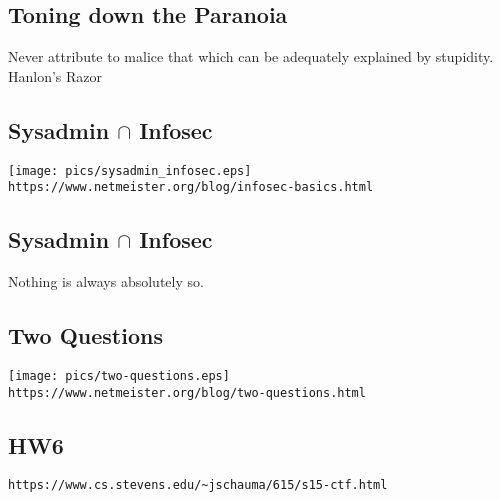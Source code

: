 \documentclass[xga]{xdvislides}
\begin{document}
\subsection{Toning down the Paranoia}
\vspace*{\fill}
\Huge
\begin{center}
Never attribute to malice that which can be adequately explained by stupidity. \\
\vspace{.25in}
\Normalsize
Hanlon's Razor
\end{center}
\Normalsize
\vspace*{\fill}

\subsection{Sysadmin $\cap$ Infosec}
\vspace*{\fill}
\begin{center}
	\texttt{[image: pics/sysadmin\_infosec.eps]} \\
	\verb+https://www.netmeister.org/blog/infosec-basics.html+
\end{center}
\vspace*{\fill}

\subsection{Sysadmin $\cap$ Infosec}
\vspace*{\fill}
\Huge
\begin{center}
	Nothing is always absolutely so.
\end{center}
\Normalsize
\vspace*{\fill}

\subsection{Two Questions}
\vspace*{\fill}
\begin{center}
	\texttt{[image: pics/two-questions.eps]} \\
\small
	\verb+https://www.netmeister.org/blog/two-questions.html+
\end{center}
\Normalsize
\vspace*{\fill}

\subsection{HW6}
\vspace*{\fill}
\begin{center}
	\verb+https://www.cs.stevens.edu/~jschauma/615/s15-ctf.html+
\end{center}
\Normalsize
\vspace*{\fill}
\end{document}

